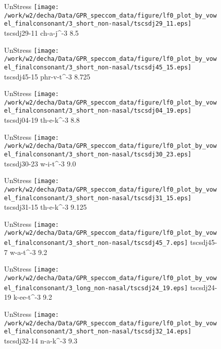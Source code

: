 \documentclass{article}
\begin{document}
\begin{figure}[t]
\begin{minipage}[b]{.24\textwidth}
UnStress
\centering
\texttt{[image: /work/w2/decha/Data/GPR\_speccom\_data/figure/lf0\_plot\_by\_vowel\_finalconsonant/3\_short\_non-nasal/tscsdj29\_11.eps]}
tscsdj29-11 ch-a-j\textasciicircum-3 8.5
\end{minipage}
\begin{minipage}[b]{.24\textwidth}
UnStress
\centering
\texttt{[image: /work/w2/decha/Data/GPR\_speccom\_data/figure/lf0\_plot\_by\_vowel\_finalconsonant/3\_short\_non-nasal/tscsdj45\_15.eps]}
tscsdj45-15 phr-v-t\textasciicircum-3 8.725
\end{minipage}
\begin{minipage}[b]{.24\textwidth}
UnStress
\centering
\texttt{[image: /work/w2/decha/Data/GPR\_speccom\_data/figure/lf0\_plot\_by\_vowel\_finalconsonant/3\_short\_non-nasal/tscsdj04\_19.eps]}
tscsdj04-19 th-e-k\textasciicircum-3 8.8
\end{minipage}
\begin{minipage}[b]{.24\textwidth}
UnStress
\centering
\texttt{[image: /work/w2/decha/Data/GPR\_speccom\_data/figure/lf0\_plot\_by\_vowel\_finalconsonant/3\_short\_non-nasal/tscsdj30\_23.eps]}
tscsdj30-23 w-i-t\textasciicircum-3 9.0
\end{minipage}
\end{figure}

\begin{figure}[t]
\begin{minipage}[b]{.24\textwidth}
UnStress
\centering
\texttt{[image: /work/w2/decha/Data/GPR\_speccom\_data/figure/lf0\_plot\_by\_vowel\_finalconsonant/3\_short\_non-nasal/tscsdj31\_15.eps]}
tscsdj31-15 th-e-k\textasciicircum-3 9.125
\end{minipage}
\begin{minipage}[b]{.24\textwidth}
UnStress
\centering
\texttt{[image: /work/w2/decha/Data/GPR\_speccom\_data/figure/lf0\_plot\_by\_vowel\_finalconsonant/3\_short\_non-nasal/tscsdj45\_7.eps]}
tscsdj45-7 w-a-t\textasciicircum-3 9.2
\end{minipage}
\begin{minipage}[b]{.24\textwidth}
UnStress
\centering
\texttt{[image: /work/w2/decha/Data/GPR\_speccom\_data/figure/lf0\_plot\_by\_vowel\_finalconsonant/3\_long\_non-nasal/tscsdj24\_19.eps]}
tscsdj24-19 k-ee-t\textasciicircum-3 9.2
\end{minipage}
\begin{minipage}[b]{.24\textwidth}
UnStress
\centering
\texttt{[image: /work/w2/decha/Data/GPR\_speccom\_data/figure/lf0\_plot\_by\_vowel\_finalconsonant/3\_short\_non-nasal/tscsdj32\_14.eps]}
tscsdj32-14 n-a-k\textasciicircum-3 9.3
\end{minipage}
\end{figure}
\end{document}
